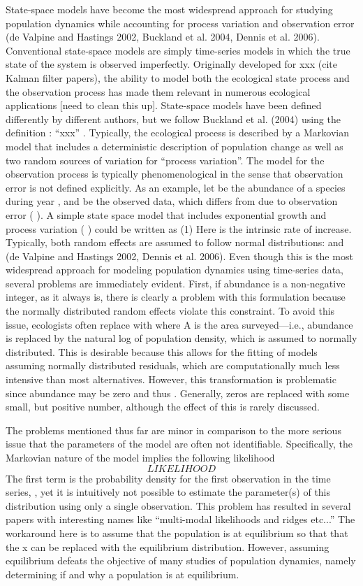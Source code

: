 \documentclass{article}
\begin{document}
State-space models have become the most widespread approach for
studying population dynamics while accounting for process variation
and observation error (de Valpine and Hastings 2002, Buckland et
al. 2004, Dennis et al. 2006). Conventional state-space models are
simply time-series models in which the true state of the system is
observed imperfectly. Originally developed for xxx (cite Kalman filter
papers), the ability to model both the ecological state process and
the observation process has made them relevant in numerous ecological
applications [need to clean this up]. State-space models have been
defined differently by different authors, but we follow Buckland et
al. (2004) using the definition : ``xxx'' . Typically, the ecological
process is described by a Markovian model that includes a
deterministic description of population change as well as two random
sources of variation for ``process variation''. The model for the
observation process is typically phenomenological in the sense that
observation error is not defined explicitly. As an example, let  be
the abundance of a species during year  , and   be the observed data,
which differs from  due to observation error ( ). A simple state space
model that includes exponential growth and process variation ( ) could
be written as
	 	(1)
Here   is the intrinsic rate of increase. Typically, both random
effects are assumed to follow normal distributions:   and   (de
Valpine and Hastings 2002, Dennis et al. 2006). Even though this is
the most widespread approach for modeling population dynamics using
time-series data, several problems are immediately evident. First, if
abundance is a non-negative integer, as it always is, there is clearly
a problem with this formulation because the normally distributed
random effects violate this constraint. To avoid this issue,
ecologists often replace   with   where A is the area surveyed---i.e.,
abundance is replaced by the natural log of population density, which
is assumed to normally distributed. This is desirable because this
allows for the fitting of models assuming normally distributed
residuals, which are computationally much less intensive than most
alternatives. However, this transformation is problematic since
abundance may be zero and thus . Generally, zeros are replaced with
some small, but positive number, although the effect of this is rarely
discussed.

The problems mentioned thus far are minor in comparison to the more
serious issue that the parameters of the model are often not
identifiable. Specifically, the Markovian nature of the model implies
the following likelihood
\[
LIKELIHOOD
\]
The first term is the probability density for the first observation in
the time series,  , yet it is intuitively not possible to estimate the
parameter(s) of this distribution using only a single
observation. This problem has resulted in several papers with
interesting names like ``multi-modal likelihoods and ridges etc...''
The workaround here is to assume that the population is at equilibrium
so that that the x can be replaced with the equilibrium
distribution. However, assuming equilibrium defeats the objective of
many studies of population dynamics, namely determining if and why a
population is at equilibrium.
\end{document}
